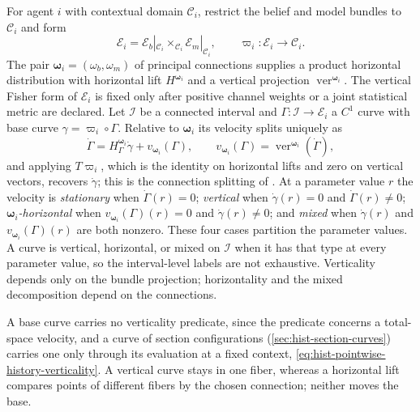 For agent \(i\) with contextual domain \(\mathcal C_i\), restrict the belief and
model bundles to \(\mathcal C_i\) and form
\begin{equation}
\mathcal E_i
=\mathcal E_b|_{\mathcal C_i}
\times_{\mathcal C_i}
\mathcal E_m|_{\mathcal C_i},
\qquad
\varpi_i:\mathcal E_i\longrightarrow\mathcal C_i.
\label{eq:hist-agent-product-bundle}
\end{equation}
The pair \(\boldsymbol\omega_i=(\omega_b,\omega_m)\) of principal connections
supplies a product horizontal distribution with horizontal lift
\(H^{\boldsymbol\omega_i}\) and a vertical projection
\(\operatorname{ver}^{\boldsymbol\omega_i}\). The vertical Fisher form of
\(\mathcal E_i\) is fixed only after positive channel weights or a joint
statistical metric are declared. Let \(\mathscr I\) be a connected interval and
\(\Gamma:\mathscr I\to\mathcal E_i\) a \(C^1\) curve with base curve
\(\gamma=\varpi_i\circ\Gamma\). Relative to \(\boldsymbol\omega_i\) its velocity
splits uniquely as
\begin{equation}
\dot\Gamma
=H^{\boldsymbol\omega_i}_{\Gamma}\dot\gamma
+v_{\boldsymbol\omega_i}(\Gamma),
\qquad
v_{\boldsymbol\omega_i}(\Gamma)
=\operatorname{ver}^{\boldsymbol\omega_i}(\dot\Gamma),
\label{eq:hist-total-curve-splitting}
\end{equation}
and applying \(T\varpi_i\), which is the identity on horizontal lifts and zero
on vertical vectors, recovers \(\dot\gamma\); this is the connection splitting
of \citet[Ch.~II]{Kobayashi1963}. At a parameter value \(r\) the velocity is
\emph{stationary} when \(\dot\Gamma(r)=0\); \emph{vertical} when
\(\dot\gamma(r)=0\) and \(\dot\Gamma(r)\ne0\);
\emph{\(\boldsymbol\omega_i\)-horizontal} when
\(v_{\boldsymbol\omega_i}(\Gamma)(r)=0\) and \(\dot\gamma(r)\ne0\); and
\emph{mixed} when \(\dot\gamma(r)\) and \(v_{\boldsymbol\omega_i}(\Gamma)(r)\)
are both nonzero. These four cases partition the parameter values. A curve is
vertical, horizontal, or mixed on \(\mathscr I\) when it has that type at every
parameter value, so the interval-level labels are not exhaustive. Verticality
depends only on the bundle projection; horizontality and the mixed
decomposition depend on the connections.

A base curve carries no verticality predicate, since the predicate concerns a
total-space velocity, and a curve of section configurations
(\cref{sec:hist-section-curves}) carries one only through its evaluation at a
fixed context, \eqref{eq:hist-pointwise-history-verticality}. A vertical curve
stays in one fiber, whereas a horizontal lift compares points of different
fibers by the chosen connection; neither moves the base.

